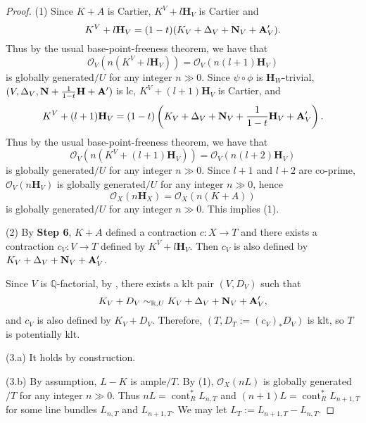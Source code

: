 \documentclass[12pt]{amsart}
\numberwithin{equation}{section}
\newcommand{\Nn}{{\bf{N}}}
\newcommand{\Qq}{\mathbb{Q}}
\newcommand{\Hh}{\mathbf{H}}
\newcommand{\cont}{\operatorname{cont}}
\newcommand{\Aa}{{\bf{A}}}
\theoremstyle{definition}
\theoremstyle{definition}
\theoremstyle{definition}
\begin{document}
\begin{proof}
(1) Since $K+A$ is Cartier, $K^V+l\Hh_V$ is Cartier and 
$$K^V+l\Hh_V=(1-t)(K_V+\Delta_V+\Nn_V+\Aa'_V).$$
Thus by the usual base-point-freeness theorem, we have that 
$$\mathcal{O}_{V}(n(K^V+l\Hh_{V}))=\mathcal{O}_{V}(n(l+1)\Hh_{V})$$ is globally generated$/U$ for any integer $n\gg 0$. Since $\psi\circ\phi$ is $\Hh_W$-trivial, $(V,\Delta_V,\Nn+\frac{1}{1-t}\Hh+\Aa')$ is lc, $K^V+(l+1)\Hh_{V}$ is Cartier, and 
$$K^V+(l+1)\Hh_{V}=(1-t)\left(K_V+\Delta_V+\Nn_V+\frac{1}{1-t}\Hh_V+\Aa'_V\right).$$
Thus by the usual base-point-freeness theorem, we have that
$$\mathcal{O}_{V}(n(K^V+(l+1)\Hh_{V}))=\mathcal{O}_{V}(n(l+2)\Hh_{V})$$ is globally generated$/U$ for any integer $n\gg 0$. Since $l+1$ and $l+2$ are co-prime, 
$\mathcal{O}_{V}(n\Hh_{V})$
is globally generated$/U$ for any integer $n\gg 0$, hence $$\mathcal{O}_{X}(n\Hh_X)=\mathcal{O}_{X}(n(K+A))$$
is globally generated$/U$ for any integer $n\gg 0$. This implies (1).

(2) By \textbf{Step 6}, $K+A$ defined a contraction $c: X\rightarrow T$ and there exists a contraction $c_V: V\rightarrow T$ defined by $K^V+l\Hh_V$. Then $c_V$ is also defined by $K_V+\Delta_V+\Nn_V+\Aa'_V$. 

Since $V$ is $\Qq$-factorial, by \cite[Lemma 3.4]{HL22}, there exists a klt pair $(V,D_V)$ such that
$$K_V+D_V\sim_{\mathbb R,U}K_V+\Delta_V+\Nn_V+\Aa'_V,$$
and $c_V$ is also defined by $K_V+D_V$. Therefore, $(T,D_T:=(c_V)_\ast D_V)$ is klt, so $T$ is potentially klt.

(3.a) It holds by construction.

(3.b) By assumption, $L-K$ is ample$/T$. By (1), $\mathcal{O}_X(nL)$ is globally generated$/T$ for any integer $n\gg 0$. Thus $nL=\cont_R^\ast L_{n,T}$ and  $(n+1)L=\cont_R^\ast L_{n+1,T}$ for some line bundles $L_{n,T}$ and $L_{n+1,T}$. We may let $L_T:=L_{n+1,T}-L_{n,T}$.
\end{proof}
\end{document}
